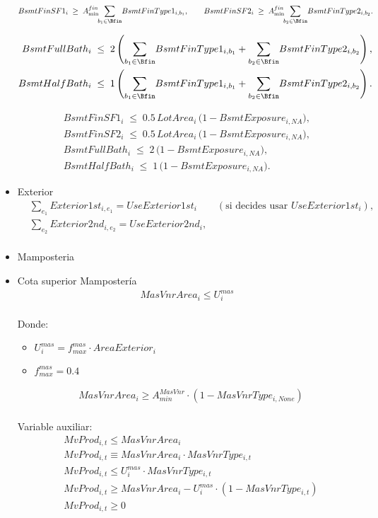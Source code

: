 \begin{itemize}
\begin{align}
BsmtFinSF1_i \;\ge\; A^{fin}_{\min} \!\!\sum_{b_1\in \Bfin}\! BsmtFinType1_{i,b_1}, \qquad
  BsmtFinSF2_i \;\ge\; A^{fin}_{\min} \!\!\sum_{b_2\in \Bfin}\! BsmtFinType2_{i,b_2}. \label{eq:fin-min}
\end{align}


\begin{align}
BsmtFullBath_i \;\le\; 2 \left(
     \sum_{b_1\in \Bfin}\! BsmtFinType1_{i,b_1}
   + \sum_{b_2\in \Bfin}\! BsmtFinType2_{i,b_2} \right), \label{eq:bbath-full}\\
BsmtHalfBath_i \;\le\; 1 \left(
     \sum_{b_1\in \Bfin}\! BsmtFinType1_{i,b_1}
   + \sum_{b_2\in \Bfin}\! BsmtFinType2_{i,b_2} \right). \label{eq:bbath-half}
\end{align}

\begin{align}
BsmtFinSF1_i \;\le\; 0.5\,LotArea_i \,\big(1 - BsmtExposure_{i,NA}\big), \\
BsmtFinSF2_i \;\le\; 0.5\,LotArea_i \,\big(1 - BsmtExposure_{i,NA}\big), \\
BsmtFullBath_i \;\le\; 2\,\big(1 - BsmtExposure_{i,NA}\big), \qquad\\
  BsmtHalfBath_i \;\le\; 1\,\big(1 - BsmtExposure_{i,NA}\big).
\end{align}



    \item {Exterior}
\begin{align}
& \sum_{e_1} Exterior1st_{i,e_1} = UseExterior1st_i \qquad (\text{si decides usar }UseExterior1st_i),\\
& \sum_{e_2} Exterior2nd_{i,e_2} = UseExterior2nd_i,\\
\end{align}
    \item {Mamposteria}
    \item{Cota superior Mampostería}
\begin{align}
    MasVnrArea_{i}\leq U_{i}^{mas}
\end{align}\\
Donde:
    \begin{itemize}
        \item $U_{i}^{mas}=f_{max}^{mas}\cdot AreaExterior_{i}$
        \item $f_{max}^{mas}=0.4$
    \end{itemize}
\begin{align}
    &MasVnrArea_{i}\geq A_{min}^{MasVnr}\cdot (1-MasVnrType_{i,None})
\end{align}\\
Variable auxiliar:\\
\begin{align}
    &MvProd_{i,t}\leq MasVnrArea_{i}\\
    &MvProd_{i,t}\equiv MasVnrArea_{i} \cdot MasVnrType_{i,t}\\
    &MvProd_{i,t} \leq U_{i}^{mas}\cdot MasVnrType_{i,t}\\
    &MvProd_{i,t}\geq MasVnrArea_{i} - U_{i}^{mas}\cdot (1-MasVnrType_{i,t})\\
    &MvProd_{i,t}\geq 0
\end{align}


\end{itemize}
